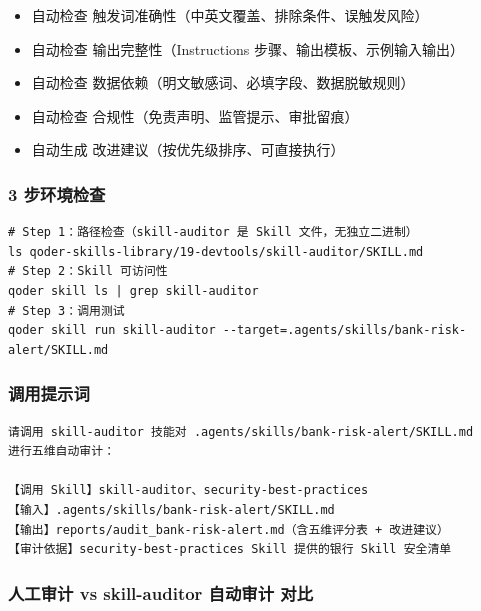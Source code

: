 \begin{itemize}[leftmargin=1em]
  \item 自动检查 触发词准确性（中英文覆盖、排除条件、误触发风险）
  \item 自动检查 输出完整性（Instructions 步骤、输出模板、示例输入输出）
  \item 自动检查 数据依赖（明文敏感词、必填字段、数据脱敏规则）
  \item 自动检查 合规性（免责声明、监管提示、审批留痕）
  \item 自动生成 改进建议（按优先级排序、可直接执行）
\end{itemize}

\subsubsection{3 步环境检查}

\begin{lstlisting}[style=shell]
# Step 1：路径检查（skill-auditor 是 Skill 文件，无独立二进制）
ls qoder-skills-library/19-devtools/skill-auditor/SKILL.md
# Step 2：Skill 可访问性
qoder skill ls | grep skill-auditor
# Step 3：调用测试
qoder skill run skill-auditor --target=.agents/skills/bank-risk-alert/SKILL.md
\end{lstlisting}

\subsubsection{调用提示词}

\begin{lstlisting}
请调用 skill-auditor 技能对 .agents/skills/bank-risk-alert/SKILL.md
进行五维自动审计：

【调用 Skill】skill-auditor、security-best-practices
【输入】.agents/skills/bank-risk-alert/SKILL.md
【输出】reports/audit_bank-risk-alert.md（含五维评分表 + 改进建议）
【审计依据】security-best-practices Skill 提供的银行 Skill 安全清单
\end{lstlisting}

\subsubsection{人工审计 vs skill-auditor 自动审计 对比}

